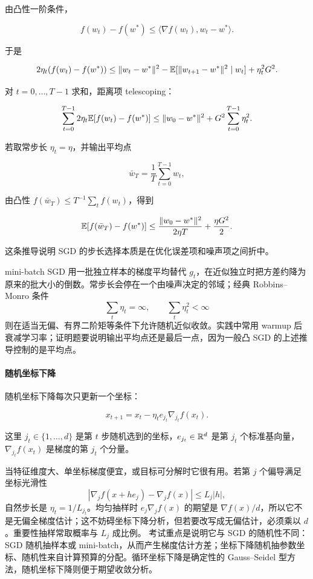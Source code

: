 \documentclass[11pt]{ctexart}
\begin{document}
由凸性一阶条件，

\[
  f(w_t)-f(w^*)
  \le
  \langle\nabla f(w_t),w_t-w^*\rangle.
\]

于是

\[
  2\eta_t(f(w_t)-f(w^*))
  \le
  \|w_t-w^*\|^2
  -
  \mathbb{E}[\|w_{t+1}-w^*\|^2\mid w_t]
  +
  \eta_t^2G^2.
\]

对 \(t=0,\ldots,T-1\) 求和，距离项 telescoping：

\[
  \sum_{t=0}^{T-1}
  2\eta_t\mathbb{E}[f(w_t)-f(w^*)]
  \le
  \|w_0-w^*\|^2
  +
  G^2\sum_{t=0}^{T-1}\eta_t^2.
\]

若取常步长 \(\eta_t=\eta\)，并输出平均点

\[
  \bar w_T=\frac1T\sum_{t=0}^{T-1}w_t,
\]

由凸性 \(f(\bar w_T)\le T^{-1}\sum_t f(w_t)\)，得到

\[
  \mathbb{E}[f(\bar w_T)-f(w^*)]
  \le
  \frac{\|w_0-w^*\|^2}{2\eta T}
  +
  \frac{\eta G^2}{2}.
\]

这条推导说明 SGD 的步长选择本质是在优化误差项和噪声项之间折中。

mini-batch SGD 用一批独立样本的梯度平均替代 \(g_t\)，在近似独立时把方差约降为原来的批大小的倒数。常步长会停在一个由噪声决定的邻域；经典 Robbins--Monro 条件
\[
  \sum_t\eta_t=\infty,\qquad \sum_t\eta_t^2<\infty
\]
则在适当无偏、有界二阶矩等条件下允许随机近似收敛。实践中常用 warmup 后衰减学习率；证明题要说明输出平均点还是最后一点，因为一般凸 SGD 的上述推导控制的是平均点。

\paragraph{随机坐标下降}

随机坐标下降每次只更新一个坐标：

\[
  x_{t+1}
  =
  x_t-\eta_t e_{j_t}\nabla_{j_t}f(x_t).
\]

这里 \(j_t\in\{1,\ldots,d\}\) 是第 \(t\) 步随机选到的坐标，\(e_{j_t}\in\mathbb{R}^d\) 是第 \(j_t\) 个标准基向量，\(\nabla_{j_t}f(x_t)\) 是梯度的第 \(j_t\) 个分量。

当特征维度大、单坐标梯度便宜，或目标可分解时它很有用。若第 \(j\) 个偏导满足坐标光滑性
\[
  |\nabla_jf(x+he_j)-\nabla_jf(x)|\le L_j|h|,
\]
自然步长是 \(\eta_t=1/L_{j_t}\)。均匀抽样时 \(e_j\nabla_jf(x)\) 的期望是 \(\nabla f(x)/d\)，所以它不是无偏全梯度估计；这不妨碍坐标下降分析，但若要改写成无偏估计，必须乘以 \(d\)。重要性抽样常取概率与 \(L_j\) 成比例。
考试重点是说明它与 SGD 的随机性不同：SGD 随机抽样本或 mini-batch，从而产生梯度估计方差；坐标下降随机抽参数坐标、随机性来自计算预算的分配。循环坐标下降是确定性的 Gauss--Seidel 型方法，随机坐标下降则便于期望收敛分析。
\end{document}
